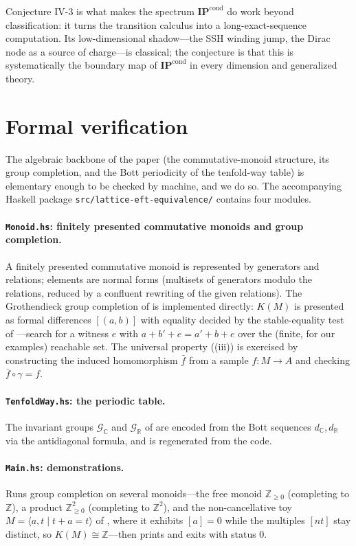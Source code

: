 \documentclass[12pt]{article}
\newcommand{\IPcond}{\mathbf{IP}^{\mathrm{cond}}}  %
\newcommand{\Groth}{K}                       %
\newcommand{\Zp}{\mathbb{Z}}
\theoremstyle{definition}
\theoremstyle{remark}
\theoremstyle{plain}
\begin{document}
Conjecture IV-3 is what makes the spectrum $\IPcond$ do work beyond
classification: it turns the transition calculus into a long-exact-sequence
computation. Its low-dimensional shadow---the SSH winding jump, the Dirac node as
a source of charge---is classical; the conjecture is that this is systematically
the boundary map of $\IPcond$ in every dimension and generalized theory.

\section{Formal verification}
\label{sec:haskell}

The algebraic backbone of the paper (the commutative-monoid structure, its group
completion, and the Bott periodicity of the tenfold-way table) is elementary
enough to be checked by machine, and we do so. The accompanying Haskell package
\texttt{src/\allowbreak lattice-eft-\allowbreak equivalence/} contains four
modules.

\paragraph{\texttt{Monoid.hs}: finitely presented commutative monoids and group
completion.} A finitely presented commutative monoid is represented by generators
and relations; elements are normal forms (multisets of generators modulo the
relations, reduced by a confluent rewriting of the given relations). The
Grothendieck group completion of  is implemented directly:
$\Groth(M)$ is presented as formal differences $[(a,b)]$ with equality decided by
the stable-equality test of ---search for a witness $e$ with
$a+b'+e=a'+b+e$ over the (finite, for our examples) reachable set. The universal
property ((iii)) is exercised by constructing the induced
homomorphism $\bar f$ from a sample $f:M\to A$ and checking
$\bar f\circ\gamma=f$.

\paragraph{\texttt{TenfoldWay.hs}: the periodic table.} The invariant groups
$\mathcal G_{\mathbb C}$ and $\mathcal G_{\mathbb R}$ of  are
encoded from the Bott sequences $d_{\mathbb C},d_{\mathbb R}$ via the
antidiagonal formula, and  is regenerated from the code.

\paragraph{\texttt{Main.hs}: demonstrations.} Runs group completion on several
monoids---the free monoid $\Zp_{\ge0}$ (completing to $\Zp$), a product
$\Zp_{\ge0}^2$ (completing to $\Zp^2$), and the non-cancellative toy
$M=\langle a,t\mid t+a=t\rangle$ of , where it exhibits $[a]=0$
while the multiples $[nt]$ stay distinct, so $\Groth(M)\cong\Zp$---then prints
 and exits with status $0$.
\end{document}
